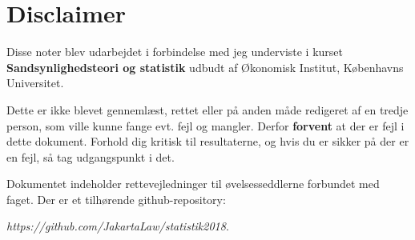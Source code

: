 \section{Disclaimer}

Disse noter blev udarbejdet i forbindelse med jeg underviste i kurset \textbf{Sandsynlighedsteori og statistik} udbudt af Økonomisk Institut, Københavns Universitet.

Dette er ikke blevet gennemlæst, rettet eller på anden måde redigeret af en tredje person, som ville kunne fange evt. fejl og mangler. Derfor \textbf{forvent} at der er fejl i dette dokument. Forhold dig kritisk til resultaterne, og hvis du er sikker på der er en fejl, så tag udgangspunkt i det.

Dokumentet indeholder rettevejledninger til øvelsesseddlerne forbundet med faget. Der er et tilhørende github-repository: 


\textit{https://github.com/JakartaLaw/statistik2018}.

